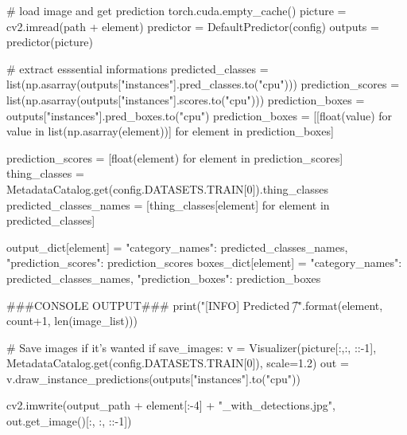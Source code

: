 \documentclass[a4paper,12pt,ngerman]{article}
\begin{document}
\begin{python}
	# load image and get prediction
	torch.cuda.empty_cache()
	picture = cv2.imread(path + element)
	predictor = DefaultPredictor(config)
	outputs = predictor(picture)

	# extract esssential informations
	predicted_classes = list(np.asarray(outputs["instances"].pred_classes.to("cpu")))
	prediction_scores = list(np.asarray(outputs["instances"].scores.to("cpu")))
	prediction_boxes = outputs["instances"].pred_boxes.to("cpu")
	prediction_boxes = [[float(value) for value in list(np.asarray(element))] for element in prediction_boxes]

	prediction_scores = [float(element) for element in prediction_scores]
	thing_classes = MetadataCatalog.get(config.DATASETS.TRAIN[0]).thing_classes
	predicted_classes_names = [thing_classes[element] for element in predicted_classes]
	
	output_dict[element] = {"category_names": predicted_classes_names, "prediction_scores": prediction_scores}
	boxes_dict[element] = {"category_names": predicted_classes_names, "prediction_boxes": prediction_boxes}

	###CONSOLE OUTPUT###
	print("[INFO] Predicted {}\t{}/{}".format(element, count+1, len(image_list)))

	# Save images if it's wanted
	if save_images:
		v = Visualizer(picture[:,:, ::-1], MetadataCatalog.get(config.DATASETS.TRAIN[0]), scale=1.2)
		out = v.draw_instance_predictions(outputs["instances"].to("cpu"))

		cv2.imwrite(output_path + element[:-4] + "_with_detections.jpg", out.get_image()[:, :, ::-1])
\end{python}
\end{document}
